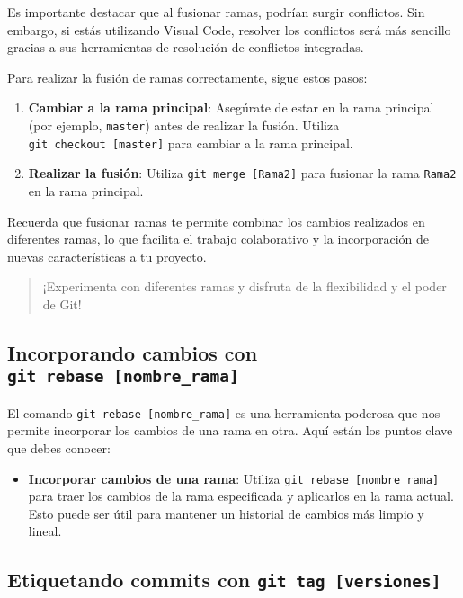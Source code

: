 \documentclass[
  a4paper,
]{article}
\providecommand{\tightlist}{%
  \setlength{\itemsep}{0pt}\setlength{\parskip}{0pt}}\usepackage{longtable,booktabs,array}
\begin{document}
Es importante destacar que al fusionar ramas, podrían surgir conflictos.
Sin embargo, si estás utilizando Visual Code, resolver los conflictos
será más sencillo gracias a sus herramientas de resolución de conflictos
integradas.

Para realizar la fusión de ramas correctamente, sigue estos pasos:

\begin{enumerate}
\def\labelenumi{\arabic{enumi}.}
\item
  \textbf{Cambiar a la rama principal}: Asegúrate de estar en la rama
  principal (por ejemplo, \texttt{master}) antes de realizar la fusión.
  Utiliza \texttt{git\ checkout\ {[}master{]}} para cambiar a la rama
  principal.
\item
  \textbf{Realizar la fusión}: Utiliza \texttt{git\ merge\ {[}Rama2{]}}
  para fusionar la rama \texttt{Rama2} en la rama principal.
\end{enumerate}

Recuerda que fusionar ramas te permite combinar los cambios realizados
en diferentes ramas, lo que facilita el trabajo colaborativo y la
incorporación de nuevas características a tu proyecto.

\begin{quote}
¡Experimenta con diferentes ramas y disfruta de la flexibilidad y el
poder de Git!
\end{quote}

\subsection{\texorpdfstring{Incorporando cambios con
\texttt{git\ rebase\ {[}nombre\_rama{]}}}{Incorporando cambios con git rebase {[}nombre\_rama{]}}}\label{incorporando-cambios-con-git-rebase-nombre_rama}

El comando \texttt{git\ rebase\ {[}nombre\_rama{]}} es una herramienta
poderosa que nos permite incorporar los cambios de una rama en otra.
Aquí están los puntos clave que debes conocer:

\begin{itemize}
\tightlist
\item
  \textbf{Incorporar cambios de una rama}: Utiliza
  \texttt{git\ rebase\ {[}nombre\_rama{]}} para traer los cambios de la
  rama especificada y aplicarlos en la rama actual. Esto puede ser útil
  para mantener un historial de cambios más limpio y lineal.
\end{itemize}

\subsection{\texorpdfstring{Etiquetando commits con
\texttt{git\ tag\ {[}versiones{]}}}{Etiquetando commits con git tag {[}versiones{]}}}\label{etiquetando-commits-con-git-tag-versiones}
\end{document}
